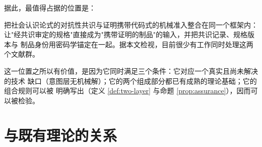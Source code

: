 据此，最值得占据的位置是：

\begin{principle}[建议的研究位置]\label{pr:position}
把社会认识论式的对抗性共识与证明携带代码式的机械准入整合在同一个框架内：
让"经共识审定的规格"直接成为"携带证明的制品"的输入，并把共识记录、规格版本与
制品身份用密码学锚定在一起。据本文检视，目前很少有工作同时处理这两个文献群。
\end{principle}

这一位置之所以有价值，是因为它同时满足三个条件：它对应一个真实且尚未解决的技术
缺口（意图层无机械解）；它的两个组成部分都已有成熟的理论基础；它的组合规则可以被
明确写出（定义 \ref{def:two-layer} 与命题 \ref{prop:assurance}），因而可以被检验。

\section{与既有理论的关系}\label{sec:relations-lit}

